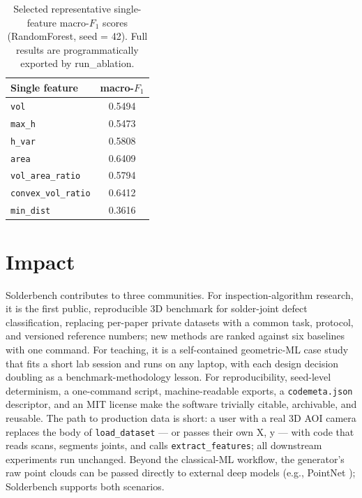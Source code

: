 \documentclass[3p]{elsarticle}
\begin{document}
\begin{table}[htbp]
\centering
\caption{Selected representative single-feature macro-$F_1$ scores (RandomForest, seed = 42). Full results are programmatically exported by run\_ablation.}
\label{tab:single}
\begin{tabular}{lc}
\toprule
\textbf{Single feature} & \textbf{macro-$F_1$} \\
\midrule
\texttt{vol}               & 0.5494 \\
\texttt{max\_h}            & 0.5473 \\
\texttt{h\_var}            & 0.5808 \\
\texttt{area}              & 0.6409 \\
\texttt{vol\_area\_ratio}   & 0.5794 \\
\texttt{convex\_vol\_ratio} & 0.6412 \\
\texttt{min\_dist}         & 0.3616 \\
\bottomrule
\end{tabular}
\end{table}
\section{Impact}
Solderbench contributes to three communities. For inspection-algorithm research, it is the first public, reproducible 3D benchmark for solder-joint defect classification, replacing per-paper private datasets with a common task, protocol, and versioned reference numbers; new methods are ranked against six baselines with one command. For teaching, it is a self-contained geometric-ML case study that fits a short lab session and runs on any laptop, with each design decision doubling as a benchmark-methodology lesson. For reproducibility, seed-level determinism, a one-command script, machine-readable exports, a \texttt{codemeta.json} descriptor, and an MIT license make the software trivially citable, archivable, and reusable. The path to production data is short: a user with a real 3D AOI camera replaces the body of \texttt{load\_dataset} --- or passes their own X, y --- with code that reads scans, segments joints, and calls \texttt{extract\_features}; all downstream experiments run unchanged. Beyond the classical-ML workflow, the generator's raw point clouds can be passed directly to external deep models (e.g., PointNet \cite{ref8,ref9}); Solderbench supports both scenarios.
\end{document}
